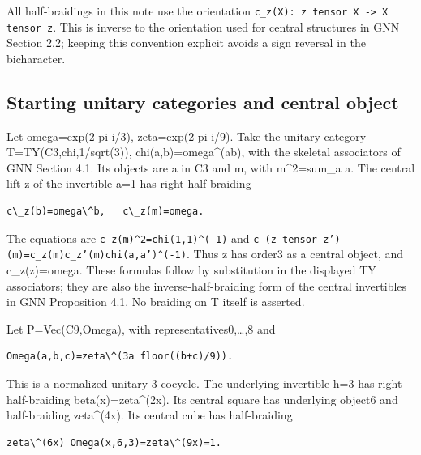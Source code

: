All half-braidings in this note use the orientation
\texttt{c\_\allowbreak{}z(X): \allowbreak{}z tens\allowbreak{}or X -\allowbreak{}> X te\allowbreak{}nsor z\allowbreak{}}.
This is inverse to the orientation used for central structures in GNN
Section 2.2; keeping this convention explicit avoids a sign reversal in
the bicharacter.

\hypertarget{starting-unitary-categories-and-central-object}{%
\subsection{Starting unitary categories and central
object}\label{starting-unitary-categories-and-central-object}}

Let omega=exp(2 pi i/3), zeta=exp(2 pi i/9). Take the unitary category
T=TY(C3,chi,1/sqrt(3)), chi(a,b)=omega\^{}(ab), with the skeletal
associators of GNN Section 4.1. Its objects are a in C3 and m, with
m\^{}2=sum\_a a. The central lift z of the invertible a=1 has right
half-braiding

\begin{verbatim}
c\_z(b)=omega\^b,   c\_z(m)=omega.
\end{verbatim}

The equations are
\texttt{c\_\allowbreak{}z(m)\textasciicircum{}2\allowbreak{}=chi(1\allowbreak{},1)\textasciicircum{}(-\allowbreak{}1)}
and
\texttt{c\_\allowbreak{}(z ten\allowbreak{}sor z'\allowbreak{})(m)=c\allowbreak{}\_\allowbreak{}z(m)c\_\allowbreak{}z'(m)c\allowbreak{}hi(a,a\allowbreak{}')\textasciicircum{}(-\allowbreak{}1)}.
Thus z has order3 as a central object, and c\_z(z)=omega. These formulas
follow by substitution in the displayed TY associators; they are also
the inverse-half-braiding form of the central invertibles in GNN
Proposition 4.1. No braiding on T itself is asserted.

Let P=Vec(C9,Omega), with representatives0,\ldots,8 and

\begin{verbatim}
Omega(a,b,c)=zeta\^(3a floor((b+c)/9)).
\end{verbatim}

This is a normalized unitary 3-cocycle. The underlying invertible h=3
has right half-braiding beta(x)=zeta\^{}(2x). Its central square has
underlying object6 and half-braiding zeta\^{}(4x). Its central cube has
half-braiding

\begin{verbatim}
zeta\^(6x) Omega(x,6,3)=zeta\^(9x)=1.
\end{verbatim}

